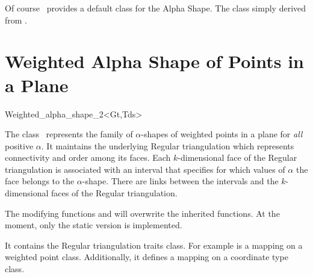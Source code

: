 Of course  \cgal\ provides a default  class
for the Alpha Shape. The class
 simply derived from 
.



\section{Weighted Alpha Shape of Points in a Plane \label{I2_SectWeighted_Alpha_Shape_2}}

\begin{ccClassTemplate} {Weighted_alpha_shape_2<Gt,Tds>}

\ccDefinition
The class \ccClassTemplateName\ represents the family of
$\alpha$-shapes of weighted points in a plane for {\em all} positive
$\alpha$. It maintains the underlying Regular triangulation which
represents connectivity and order among its faces. Each
$k$-dimensional face of the Regular triangulation is associated with
an interval that specifies for which values of $\alpha$ the face
belongs to the $\alpha$-shape. There are links between the intervals
and the $k$-dimensional faces of the Regular triangulation.



\ccInheritsFrom


The modifying functions  and  will overwrite
the inherited functions. At the moment, only the static version is implemented.

\ccTypes
{}
\ccThreeToTwo

 
It contains the Regular triangulation traits class.  For example
 is a mapping on a weighted point class. Additionally,
it defines a mapping on a coordinate type class.




\end{ccClassTemplate}
